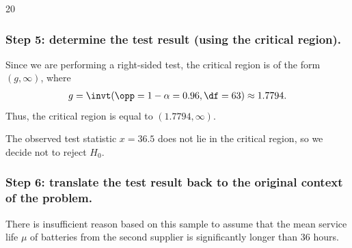 \begin{enquestion}{20}
{        \subsubsection*{Step 5: determine the test result (using the critical region).}

        Since we are performing a right-sided test, the critical region is of the form $(g, \infty)$, where
        \begin{align*}
            g = \invt(\opp=1-\alpha=0.96, \df=63) \approx 1.7794.
        \end{align*}       
        Thus, the critical region is equal to $(1.7794, \infty)$. 

        The observed test statistic $x = 36.5$ does not lie in the critical region,
        so we decide not to reject $H_0$.

        \subsubsection*{Step 6: translate the test result back to the original context of the problem.}
        There is insufficient reason based on this sample to assume that the mean service life $\mu$
        of batteries from the second supplier is significantly longer than $36$ hours.
    }
\end{enquestion}
